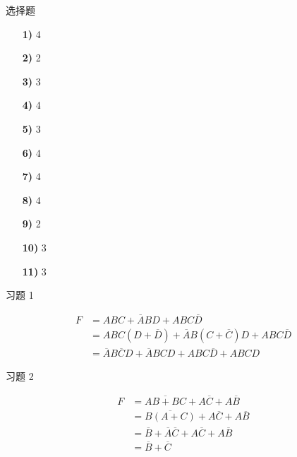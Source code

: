 \begin{problem}
    选择题
    \begin{solution}
        \begin{enumerate}
            \item[\textbf{1)}] \textcircled{\scriptsize 4}；
            \item[\textbf{2)}] \textcircled{\scriptsize 2}；
            \item[\textbf{3)}] \textcircled{\scriptsize 3}；
            \item[\textbf{4)}] \textcircled{\scriptsize 4}；
            \item[\textbf{5)}] \textcircled{\scriptsize 3}；
            \item[\textbf{6)}] \textcircled{\scriptsize 4}；
            \item[\textbf{7)}] \textcircled{\scriptsize 4}；
            \item[\textbf{8)}] \textcircled{\scriptsize 4}；
            \item[\textbf{9)}] \textcircled{\scriptsize 2}；
            \item[\textbf{10)}] \textcircled{\scriptsize 3}；
            \item[\textbf{11)}] \textcircled{\scriptsize 3}。
        \end{enumerate}
    \end{solution}
\end{problem}

\begin{problem}
    习题 1
    \begin{solution}
        $$
        \begin{aligned}
            F & = A B C + \overline{A} B D + A B C \overline{D} \\
            & = A B C (D + \overline{D}) + \overline{A} B (C + \overline{C}) D + A B C \overline{D} \\
            & = \overline{A} B \overline{C} D + \overline{A} B C D + A B C \overline{D} + A B C D
        \end{aligned}
        $$
    \end{solution}
\end{problem}

\begin{problem}
    习题 2
    \begin{solution}
        $$
        \begin{aligned}
            F & = \overline{A B + B C} + A \overline{C} + A \overline{B} \\
            & = \overline{B (A + C)} + A \overline{C} + A \overline{B} \\
            & = \overline{B} + \overline{A} \overline{C} + A \overline{C} + A \overline{B} \\
            & = \overline{B} + \overline{C}
        \end{aligned}
        $$
    \end{solution}
\end{problem}

